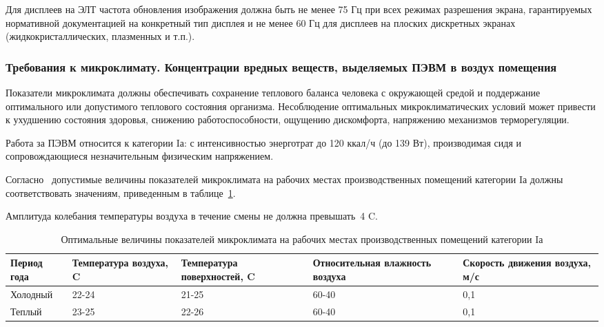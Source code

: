 Для дисплеев на ЭЛТ частота обновления изображения должна быть не менее 75 Гц при всех режимах 
разрешения экрана, гарантируемых нормативной документацией на конкретный тип дисплея и не менее 60 Гц 
для дисплеев на плоских дискретных экранах (жидкокристаллических, плазменных и т.п.).~\cite{sanpin_2.4.1340-03}


\subsubsection{Требования к микроклимату. Концентрации вредных веществ, выделяемых ПЭВМ в воздух помещения}


 Показатели микроклимата должны обеспечивать сохранение теплового баланса человека с окружающей средой и 
 поддержание оптимального или допустимого теплового состояния организма.
 Несоблюдение оптимальных микроклиматических условий может привести к ухудшению состояния здоровья,
 снижению работоспособности, ощущению дискомфорта, напряжению механизмов терморегуляции.
 
 Работа за ПЭВМ относится к категории Iа: с интенсивностью энерготрат до 120 ккал/ч (до 139 Вт), 
 производимая сидя и сопровождающиеся незначительным физическим напряжением.~\cite{sanpin_mikroclimate} 
 
 Согласно~\cite{sanpin_mikroclimate} допустимые величины показателей микроклимата на рабочих местах производственных помещений категории Iа 
 должны соответствовать значениям, приведенным в таблице~\ref{tab:climate_1}. 
 
 Амплитуда колебания температуры воздуха в течение смены не должна превышать~4\textdegree{} C.
 
\begin{table}[h!]
\caption{ Оптимальные величины показателей микроклимата на рабочих местах производственных помещений категории Iа }
\label{tab:climate_1}
\begin{center}
\begin{tabularx}{\linewidth}{|X|X|X|X|X|}
\hline
Период года & Температура воздуха, \textdegree{}C & Температура поверхностей, \textdegree{}C & Относительная влажность воздуха & Скорость движения воздуха, м/с\\
\hline
Холодный & 22-24 & 21-25 & 60-40 & 0,1\\
\hline
Теплый & 23-25 & 22-26 & 60-40 & 0,1\\
\hline
\end{tabularx}
\end{center}
\end{table}





